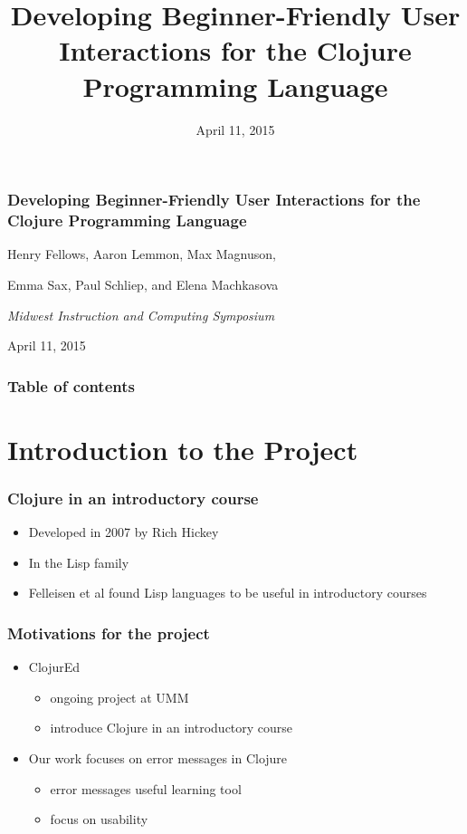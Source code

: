 \documentclass{beamer}
\begin{document}
\title{Developing Beginner-Friendly User Interactions for the Clojure Programming Language}
\date{April 11, 2015}

\begin{frame}
\frametitle{Developing Beginner-Friendly User Interactions for the Clojure Programming Language}
{\centering
\noindent
Henry Fellows, Aaron Lemmon, Max Magnuson, \par
Emma Sax, Paul Schliep, and Elena Machkasova \par

{\it 
Midwest Instruction and Computing Symposium\par
April 11, 2015\par}
}
\end{frame}

\begin{frame}
\frametitle{Table of contents}
\tableofcontents  
\end{frame}

\section{Introduction to the Project}
\begin{frame}
	\frametitle{Clojure in an introductory course}
	\begin{itemize}
		\item Developed in 2007 by Rich Hickey
		\item In the Lisp family
		\item Felleisen et al found Lisp languages to be useful in introductory courses
	\end{itemize}
\end{frame}

\begin{frame}
\frametitle{Motivations for the project}
	\begin{itemize}
		\item ClojurEd
			\begin{itemize}
				\item ongoing project at UMM
				\item introduce Clojure in an introductory course
			\end{itemize}
		\item Our work focuses on error messages in Clojure
			\begin{itemize}
				\item error messages useful learning tool
				\item focus on usability
			\end{itemize}
	\end{itemize}
\end{frame}
\end{document}

